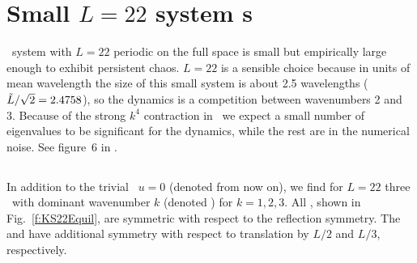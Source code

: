 %


\section{Small $L=22$ system {\rpo s}}
\label{s:L22}


\KS\ system with $L = 22$ periodic on the full space is small but
empirically large enough to exhibit persistent chaos.  $L=22$ is a
sensible choice because in units of mean wavelength the size of this
small system is about 2.5 wavelengths ($\tilde{L}/\sqrt{2}= 2.4758$),
so the dynamics is a competition between wavenumbers 2 and 3.
Because of the strong $k^4$ contraction in \KS\ we expect a small
number of eigenvalues to be significant for the dynamics, while the
rest are in the numerical noise. See figure~6 in
.


\subsection{\Eqva}

In addition to the trivial \eqv\ $u=0$ (denoted  from now
on), we find for $L = 22$ three \eqva\ with dominant wavenumber $k$
(denoted ) for $k = 1, 2, 3$.  All {\eqva}, shown in
Fig.~\ref{f:KS22Equil}, are symmetric with respect to the reflection
symmetry. The \eqva\  and  have additional symmetry with respect
to translation by $L/2$ and $L/3$, respectively.

